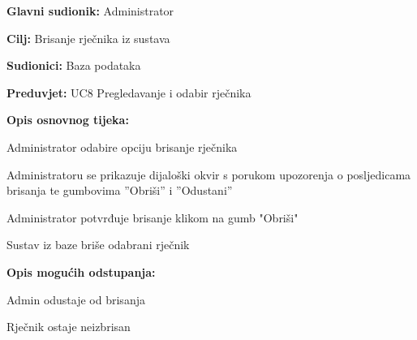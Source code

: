 \noindent {}
\begin{packed_item}

	\item \textbf{Glavni sudionik:} Administrator
	\item  \textbf{Cilj:} Brisanje rječnika iz sustava
	\item  \textbf{Sudionici:} Baza podataka
	\item  \textbf{Preduvjet:} UC8 Pregledavanje i odabir rječnika
	\item  \textbf{Opis osnovnog tijeka:}
	
	\item[] \begin{packed_enum}

		\item Administrator odabire opciju brisanje rječnika
		\item Administratoru se prikazuje dijaloški okvir s porukom upozorenja o posljedicama brisanja te gumbovima ”Obriši” i ”Odustani”
		\item Administrator potvrđuje brisanje klikom na gumb "Obriši"
		\item Sustav iz baze briše odabrani rječnik
		
	\end{packed_enum}

	\item  \textbf{Opis mogućih odstupanja:}
	
	\item[] \begin{packed_item}

		\item[3.a] Admin odustaje od brisanja
		\item[] \begin{packed_enum}
			
			\item Rječnik ostaje neizbrisan
			
		\end{packed_enum}
		
	\end{packed_item}

\end{packed_item}

